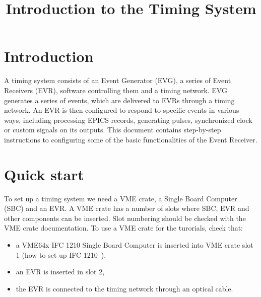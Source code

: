 \documentclass[12pt,a4paper]{article}
\title{Introduction to the Timing System}
\begin{document}
\maketitle

\tableofcontents
\newpage

\section{Introduction}
A timing system consists of an Event Generator (EVG), a series of Event Receivers (EVR), software controlling them and a timing network. EVG generates a series of events, which are delivered to EVRs through a timing network. An EVR is then configured to respond to specific events in various ways, including processing EPICS records, generating pulses, synchronized clock or custom signals on its outputs.
This document contains step-by-step instructions to configuring some of the basic functionalities of the Event Receiver.

\section{Quick start}\label{sec:Quick start}
To set up a timing system we need a VME crate, a Single Board Computer (SBC) and an EVR. A VME crate has a number of slots where SBC, EVR and other components can be inserted. Slot numbering should be checked with the VME crate documentation. To use a VME crate for the turorials, check that:
\begin{itemize}
	 \item a VME64x IFC 1210 Single Board Computer is inserted into VME crate slot 1 (how to set up IFC 1210~\cite{ifc}),
	\item  an EVR is inserted in slot 2,
	\item the EVR is connected to the timing network through an optical cable.
\end{itemize}
\end{document}
